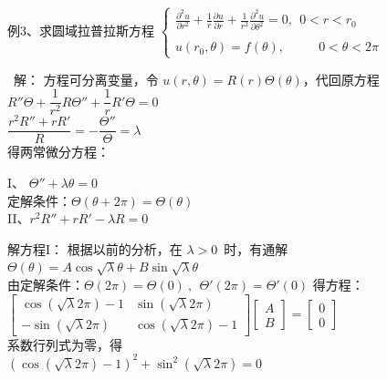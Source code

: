 \begin{frame}	
	\begin{exampleblock} {例3、求圆域拉普拉斯方程}
	{ $  \displaystyle  \left \{ 
	\begin{array}{cc}
		\displaystyle {	\frac{\partial^2 u }{\partial r^2 } +\frac{1}{r } \frac{\partial u }{\partial r } +
			\frac{1}{r^2 } \frac{\partial ^2 u }{\partial \theta ^2
		} } =0, ~~ 0<r<r_0\\
		\\
		u(r_0,\theta )=f(\theta ) ,~~~~~~~~~~~~ 0<\theta <2\pi 
	\end{array}
	\right. $}  
	\end{exampleblock}	
	\alert{ 解：}	 
	方程可分离变量，令 $\displaystyle  u(r,\theta)=R(r) \Theta(\theta)$，代回原方程  \\ 
	{ $\displaystyle  R''\Theta +\dfrac{1}{r^2} R\Theta '' +\dfrac{1}{r}R'\Theta=0 $} \\ 
	{ $\displaystyle  \dfrac{r^2R''+rR'}{R}=-\dfrac{\Theta '' }{\Theta} =\lambda $} \\ 
	得两常微分方程：
\end{frame}	

\begin{frame}	
	I、 $\displaystyle 	\Theta '' + \lambda \theta =0 $  \\ 
	定解条件：$\displaystyle 	\Theta(\theta +2 \pi )=\Theta (\theta)  $  \\ 
	II、$\displaystyle  r^2 R'' +r R' -\lambda R =0 $  \\   \vspace{0.6 cm}	
	
	解方程I：  根据以前的分析，在 $\lambda > 0 $ 时，有通解\\ 
	{ $\displaystyle  \Theta(\theta)=A\cos \sqrt{\lambda } \theta+B\sin \sqrt{\lambda }\theta$}\\ 
	由定解条件：$\displaystyle 	\Theta(2 \pi )=\Theta (0)~,~~ 	\Theta' (2 \pi )=\Theta' (0)  $ 得方程： \\ 
	$ \left [
	\begin{array}{lll}
		\cos (\sqrt {\lambda} 2\pi )-1  & \sin (\sqrt {\lambda} 2\pi )\\
		-\sin (\sqrt {\lambda} 2\pi ) & \cos (\sqrt {\lambda} 2\pi )-1
	\end{array} \right] 
	\left [
	\begin{array}{lll}
		A\\
		B
	\end{array} \right] 
	=
	\left [
	\begin{array}{lll}
		0\\
		0
	\end{array} \right]
	$ \\
	系数行列式为零，得\\
	$(\cos (\sqrt {\lambda} 2\pi )-1 ) ^2 + \sin ^2 (\sqrt {\lambda} 2\pi ) =0$ \\ 
\end{frame}	

